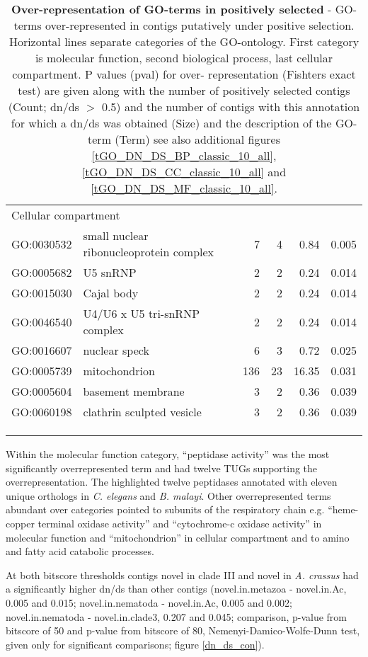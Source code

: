 \begin{longtable}{lp{4.5cm}rrrl}
  \multicolumn{6}{l}{Cellular compartment}  \\ 
  GO:0030532 & small nuclear ribonucleoprotein complex &   7 &   4 & 0.84 & 0.005 \\ 
  GO:0005682 & U5 snRNP &   2 &   2 & 0.24 & 0.014 \\ 
  GO:0015030 & Cajal body &   2 &   2 & 0.24 & 0.014 \\ 
  GO:0046540 & U4/U6 x U5 tri-snRNP complex &   2 &   2 & 0.24 & 0.014 \\ 
  GO:0016607 & nuclear speck &   6 &   3 & 0.72 & 0.025 \\ 
  GO:0005739 & mitochondrion & 136 &  23 & 16.35 & 0.031 \\ 
  GO:0005604 & basement membrane &   3 &   2 & 0.36 & 0.039 \\ 
  GO:0060198 & clathrin sculpted vesicle &   3 &   2 & 0.36 & 0.039 \\ 
\hline\\
\caption[Over-representation of GO-terms in positively
selected]{\textbf{Over-representation of GO-terms in positively
    selected} - GO-terms over-represented in contigs putatively under
  positive selection. Horizontal lines separate categories of the
  GO-ontology. First category is molecular function, second biological
  process, last cellular compartment. P values (pval) for over-
  representation (Fishters exact test) are given along with the number
  of positively selected contigs (Count; dn/ds $>$ 0.5) and the number
  of contigs with this annotation for which a dn/ds was obtained
  (Size) and the description of the GO-term (Term) see also additional
  figures \ref{tGO_DN_DS_BP_classic_10_all},
  \ref{tGO_DN_DS_CC_classic_10_all} and
  \ref{tGO_DN_DS_MF_classic_10_all}.}\\
\label{go-pos}
\end{longtable}

Within the molecular function category, ``peptidase activity'' was the
most significantly overrepresented term and had twelve TUGs supporting the
overrepresentation. The highlighted twelve peptidases annotated with
eleven unique orthologs in \textit{C. elegans} and \textit{B. malayi}.
Other overrepresented terms abundant over categories pointed to
subunits of the respiratory chain e.g. ``heme-copper terminal oxidase
activity'' and ``cytochrome-c oxidase activity'' in molecular function
and ``mitochondrion'' in cellular compartment and to amino and fatty
acid catabolic processes.

At both bitscore thresholds contigs novel in clade III and novel in
\textit{A. crassus} had a significantly higher dn/ds than other
contigs (novel.in.metazoa - novel.in.Ac, 0.005 and 0.015;
novel.in.nematoda - novel.in.Ac, 0.005 and 0.002; novel.in.nematoda -
novel.in.clade3, 0.207 and 0.045; comparison, p-value from bitscore of
50 and p-value from bitscore of 80, Nemenyi-Damico-Wolfe-Dunn test,
given only for significant comparisons; figure \ref{dn_ds_con}).

